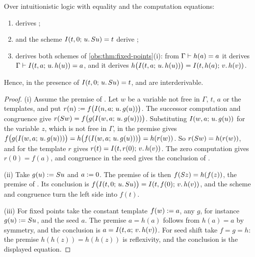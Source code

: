 \begin{proposition}
\label{obs:prop:fusion}
Over intuitionistic logic with equality and the computation equations:
\begin{enumerate}[label=(\roman*)]
\item {} derives ;
\item {} and the scheme $I(t,0;\,u.\,S u)=t$ derive
;
\item {} derives both schemes of \cref{obs:thm:fixed-points}(i):
from $\Gamma\vdash h(a)=a$ it derives $\Gamma\vdash I(t,a;\,u.\,h(u))=a$, and
it derives $h\bigl(I(t,a;\,u.\,h(u))\bigr)=I(t,h(a);\,v.\,h(v))$.
\end{enumerate}
Hence, in the presence of $I(t,0;\,u.\,S u)=t$,  and
 are interderivable.
\end{proposition}

\begin{proof}
(i) Assume the premise of . Let $w$ be a variable not free in
$\Gamma$, $t$, $a$ or the templates, and put
$r(n)\mathrel{:=} f\bigl(I(n,a;\,u.\,g(u))\bigr)$. The successor computation and
congruence give $r(S w)=f\bigl(g(I(w,a;\,u.\,g(u)))\bigr)$. Substituting
$I(w,a;\,u.\,g(u))$ for the variable $z$, which is not free in $\Gamma$, in the
premise gives
$f\bigl(g(I(w,a;\,u.\,g(u)))\bigr)=h\bigl(f(I(w,a;\,u.\,g(u)))\bigr)=h(r(w))$.
So $r(S w)=h(r(w))$, and  for the template $r$ gives
$r(t)=I(t,r(0);\,v.\,h(v))$. The zero computation gives $r(0)=f(a)$, and
congruence in the seed gives the conclusion of .

(ii) Take $g(u)\mathrel{:=}S u$ and $a\mathrel{:=} 0$. The premise of 
is then $f(S z)=h(f(z))$, the premise of . Its conclusion is
$f\bigl(I(t,0;\,u.\,S u)\bigr)=I(t,f(0);\,v.\,h(v))$, and the scheme and
congruence turn the left side into $f(t)$.

(iii) For fixed points take the constant template $f(w)\mathrel{:=} a$, any $g$, for
instance $g(u)\mathrel{:=}S u$, and the seed $a$. The premise $a=h(a)$ follows
from $h(a)=a$ by symmetry, and the conclusion is $a=I(t,a;\,v.\,h(v))$. For
seed shift take $f=g=h$: the premise $h(h(z))=h(h(z))$ is reflexivity, and the
conclusion is the displayed equation.
\end{proof}

